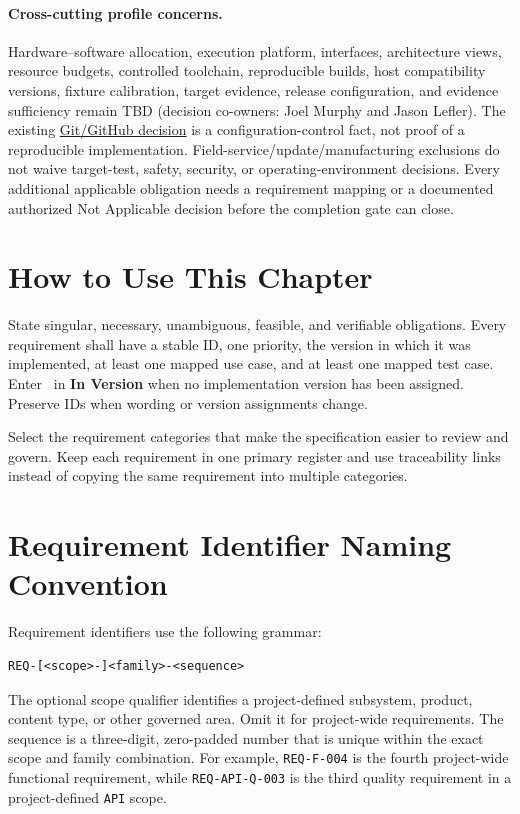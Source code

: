\paragraph{Cross-cutting profile concerns.}
Hardware--software allocation, execution platform, interfaces, architecture
views, resource budgets, controlled toolchain, reproducible builds, host
compatibility versions, fixture calibration, target evidence, release
configuration, and evidence sufficiency remain
TBD (decision co-owners: Joel Murphy and Jason Lefler). The existing
\hyperref[Section:ProjectConfigurationControl]{Git/GitHub decision} is a
configuration-control fact, not proof of a reproducible implementation.
Field-service/update/manufacturing exclusions do not waive target-test,
safety, security, or operating-environment decisions. Every additional
applicable obligation needs a requirement mapping or a documented authorized
Not Applicable decision before the completion gate can close.

\endgroup

\section{How to Use This Chapter}
State singular, necessary, unambiguous, feasible, and verifiable obligations.
Every requirement shall have a stable ID, one priority, the version in which it
was implemented, at least one mapped use case, and at least one mapped test case.
Enter \NoVersion\ in \textbf{In Version} when no implementation version has
been assigned. Preserve IDs when wording or version assignments change.

Select the requirement categories that make the specification easier to review
and govern. Keep each requirement in one primary register and use traceability
links instead of copying the same requirement into multiple categories.

\section{Requirement Identifier Naming Convention}
\label{Section:RequirementIdentifierConvention}

Requirement identifiers use the following grammar:
\begin{verbatim}
REQ-[<scope>-]<family>-<sequence>
\end{verbatim}
The optional scope qualifier identifies a project-defined subsystem, product,
content type, or other governed area. Omit it for project-wide requirements.
The sequence is a three-digit, zero-padded number that is unique within the
exact scope and family combination. For example, \texttt{REQ-F-004} is the
fourth project-wide functional requirement, while
\texttt{REQ-API-Q-003} is the third quality requirement in a project-defined
\texttt{API} scope.

